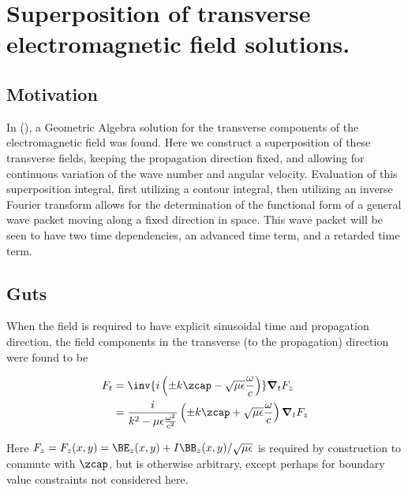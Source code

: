 

\chapter{Superposition of transverse electromagnetic field solutions.}
\label{chap:waveguideRetardedAdvanced}
{}
\date{August 1, 2009}

\beginArtWithToc

\section{Motivation}

In (\cite{transverseField}), a Geometric Algebra solution for the transverse components of the electromagnetic field was found.  Here we construct a superposition of these transverse fields, keeping the propagation direction fixed, and allowing for continuous variation of the wave number and angular velocity.  Evaluation of this superposition integral, first utilizing a contour integral, then utilizing an inverse Fourier transform allows for the determination of the functional form of a general wave packet moving along a fixed direction in space.  This wave packet will be seen to have two time dependencies, an advanced time term, and a retarded time term.

\section{Guts}

When the field is required to have explicit sinusoidal time and propagation direction, the field components in the transverse (to the propagation) direction were found to be

\begin{align}\label{eqn:waveguideRetardedAdvanced:foo7}
F_t &= \inv{i \left( \pm k \zcap - \sqrt{\mu\epsilon}\frac{\omega}{c}\right) } \spacegrad_t F_z \\
&= \frac{i}{k^2 - \mu\epsilon\frac{\omega^2}{c^2}} \left( \pm k \zcap + \sqrt{\mu\epsilon}\frac{\omega}{c}\right) \spacegrad_t F_z
\end{align}

Here $F_z = F_z(x,y) = \BE_z(x,y) + I\BB_z(x,y)/\sqrt{\mu\epsilon}$ is required by construction to commute with $\zcap$, but is otherwise arbitrary, except perhaps for boundary value constraints not considered here.

